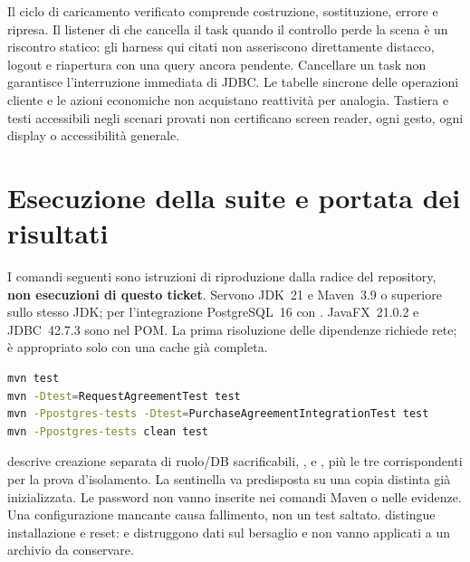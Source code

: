 Il ciclo di caricamento verificato comprende costruzione, sostituzione,
errore e ripresa. Il listener di  che cancella il task
quando il controllo perde la scena è un riscontro statico: gli harness
qui citati non asseriscono direttamente distacco, logout e riapertura
con una query ancora pendente. Cancellare un task non garantisce
l'interruzione immediata di JDBC. Le tabelle sincrone delle operazioni
cliente e le azioni economiche non acquistano reattività per analogia.
Tastiera e testi accessibili negli scenari provati non certificano screen
reader, ogni gesto, ogni display o accessibilità generale.

\section{Esecuzione della suite e portata dei risultati}\label{sec:test-esecuzione}
I comandi seguenti sono istruzioni di riproduzione dalla radice del
repository, \textbf{non esecuzioni di questo ticket}. Servono JDK~21 e
Maven~3.9 o superiore sullo stesso JDK; per l'integrazione PostgreSQL~16
con . JavaFX~21.0.2 e JDBC~42.7.3 sono nel POM. La prima
risoluzione delle dipendenze richiede rete;  è appropriato solo
con una cache già completa.

\begin{lstlisting}[language=bash,numbers=none,gobble=0,caption={Comandi attualmente documentati: selezioni distinte, non eseguite qui.},label=lst:test-comandi]
mvn test
mvn -Dtest=RequestAgreementTest test
mvn -Ppostgres-tests -Dtest=PurchaseAgreementIntegrationTest test
mvn -Ppostgres-tests clean test
\end{lstlisting}

 descrive creazione separata di ruolo/DB sacrificabili,
,  e
, più le tre corrispondenti
 per la prova d'isolamento. La sentinella
va predisposta su una copia distinta già inizializzata. Le password non
vanno inserite nei comandi Maven o nelle evidenze. Una configurazione
mancante causa fallimento, non un test saltato.
 distingue installazione e reset:
 e  distruggono dati sul bersaglio e non
vanno applicati a un archivio da conservare.

